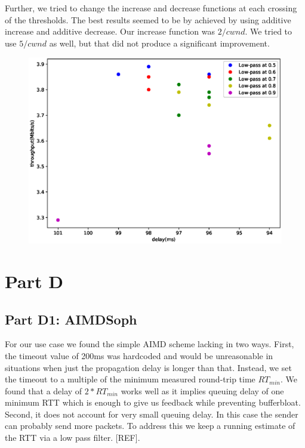 \documentclass[12pt]{article}
\begin{document}
Further, we tried to change the increase and decrease functions at each crossing
of the thresholds. The best results seemed to be by achieved by using additive
increase and additive decrease. Our increase function was $2/cwnd$. We tried to
use $5/cwnd$ as well, but that did not produce a significant improvement.

\begin{figure}[h]
 \includegraphics[width=\textwidth,height=\textheight,keepaspectratio]{figure_2.eps}
 \caption{}
 \label{fig:all}
\end{figure}

\section*{Part D}

\subsection*{Part D1: AIMDSoph}

For our use case we found the simple AIMD scheme lacking in two ways. First, the
timeout value of 200ms was hardcoded and would be unreasonable in situations
when just the propagation delay is longer than that. Instead, we set the timeout
to a multiple of the minimum measured round-trip time $RT_{min}$. We found that
a delay of $2*RT_{min}$ works well as it implies queuing delay of one minimum
RTT which is enough to give us feedback while preventing bufferbloat. Second, it
does not account for very small queuing delay. In this case the sender can
probably send more packets. To address this we keep a running estimate of the
RTT via a low pass filter. [REF]. 
\end{document}
